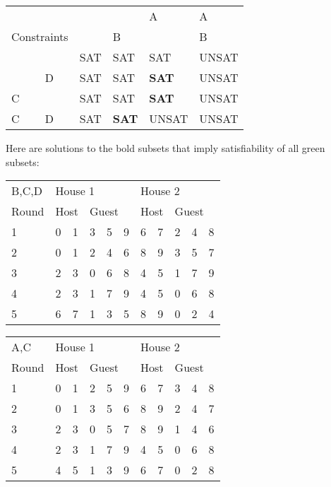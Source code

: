 \documentclass{scrartcl}
\begin{document}
\begin{itemize}
\begin{tabular}{ll|llll}
\multicolumn{2}{l|}{} & & & A & A \\
\multicolumn{2}{l|}{\multirow{-2}{*}{Constraints}} & & B & & B \\ \hline
 & & \cellcolor{green!50}SAT & \cellcolor{green!50}SAT & \cellcolor{green!50}SAT & \cellcolor{red!30}UNSAT \\
 & D & \cellcolor{green!50}SAT & \cellcolor{green!50}SAT & \cellcolor{green!50}\textbf{SAT} & \cellcolor{red!30}UNSAT \\
C & & \cellcolor{green!50}SAT & \cellcolor{green!50}SAT & \cellcolor{green!50}\textbf{SAT} & \cellcolor{red!30}UNSAT \\
C & D & \cellcolor{green!50}SAT & \cellcolor{green!50}\textbf{SAT} & \cellcolor{red!50}UNSAT & \cellcolor{red!50}UNSAT 
\end{tabular}

Here are solutions to the bold subsets that imply satisfiability of all green subsets:\\

\begin{tabular}{l|ll|lll|ll|lll}
B,C,D & \multicolumn{5}{l|}{House 1} & \multicolumn{5}{l}{House 2} \\
Round & \multicolumn{2}{l}{Host} & \multicolumn{3}{l|}{Guest} & \multicolumn{2}{l}{Host} & \multicolumn{3}{l}{Guest} \\ \hline
1 & 0 & 1 & 3 & 5 & 9 & 6 & 7 & 2 & 4 & 8 \\
2 & 0 & 1 & 2 & 4 & 6 & 8 & 9 & 3 & 5 & 7 \\
3 & 2 & 3 & 0 & 6 & 8 & 4 & 5 & 1 & 7 & 9 \\
4 & 2 & 3 & 1 & 7 & 9 & 4 & 5 & 0 & 6 & 8 \\
5 & 6 & 7 & 1 & 3 & 5 & 8 & 9 & 0 & 2 & 4 \\
\end{tabular}

\begin{tabular}{l|ll|lll|ll|lll}
A,C & \multicolumn{5}{l|}{House 1} & \multicolumn{5}{l}{House 2} \\
Round & \multicolumn{2}{l}{Host} & \multicolumn{3}{l|}{Guest} & \multicolumn{2}{l}{Host} & \multicolumn{3}{l}{Guest} \\ \hline
1 & 0 & 1 & 2 & 5 & 9 & 6 & 7 & 3 & 4 & 8 \\
2 & 0 & 1 & 3 & 5 & 6 & 8 & 9 & 2 & 4 & 7 \\
3 & 2 & 3 & 0 & 5 & 7 & 8 & 9 & 1 & 4 & 6 \\
4 & 2 & 3 & 1 & 7 & 9 & 4 & 5 & 0 & 6 & 8 \\
5 & 4 & 5 & 1 & 3 & 9 & 6 & 7 & 0 & 2 & 8 \\
\end{tabular}


\end{itemize}
\end{document}

